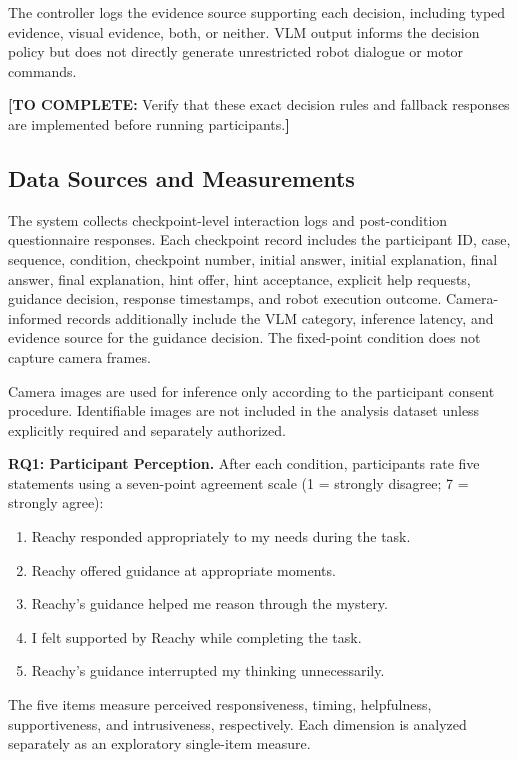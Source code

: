 \documentclass[conference]{IEEEtran}
\newcommand{\drafttodo}[1]{\par\smallskip\noindent\textcolor{red!65!black}{\textbf{[TO COMPLETE:} #1\textbf{]}}\par\smallskip}
\begin{document}
The controller logs the evidence source supporting each decision, including typed evidence, visual evidence, both, or neither. VLM output informs the decision policy but does not directly generate unrestricted robot dialogue or motor commands.

\drafttodo{Verify that these exact decision rules and fallback responses are implemented before running participants.}

\subsection{Data Sources and Measurements}

The system collects checkpoint-level interaction logs and post-condition questionnaire responses. Each checkpoint record includes the participant ID, case, sequence, condition, checkpoint number, initial answer, initial explanation, final answer, final explanation, hint offer, hint acceptance, explicit help requests, guidance decision, response timestamps, and robot execution outcome. Camera-informed records additionally include the VLM category, inference latency, and evidence source for the guidance decision. The fixed-point condition does not capture camera frames.

Camera images are used for inference only according to the participant consent procedure. Identifiable images are not included in the analysis dataset unless explicitly required and separately authorized.

\noindent\textbf{RQ1: Participant Perception.}
After each condition, participants rate five statements using a seven-point agreement scale (1 = strongly disagree; 7 = strongly agree):

\begin{enumerate}
    \item Reachy responded appropriately to my needs during the task.
    \item Reachy offered guidance at appropriate moments.
    \item Reachy's guidance helped me reason through the mystery.
    \item I felt supported by Reachy while completing the task.
    \item Reachy's guidance interrupted my thinking unnecessarily.
\end{enumerate}

The five items measure perceived responsiveness, timing, helpfulness, supportiveness, and intrusiveness, respectively. Each dimension is analyzed separately as an exploratory single-item measure.
\end{document}
